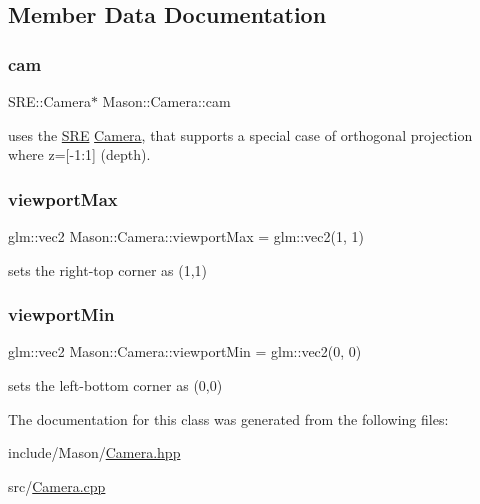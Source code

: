 \subsection{Member Data Documentation}
\hypertarget{class_mason_1_1_camera_a74f870fa866086c21f28f0a1f59254cc}{}\label{class_mason_1_1_camera_a74f870fa866086c21f28f0a1f59254cc} 
\subsubsection{\texorpdfstring{cam}{cam}}
{\footnotesize\ttfamily S\+R\+E\+::\+Camera$\ast$ Mason\+::\+Camera\+::cam\hspace{0.3cm}{\ttfamily [protected]}}



uses the \hyperlink{namespace_s_r_e}{S\+RE} \hyperlink{class_mason_1_1_camera}{Camera}, that supports a special case of orthogonal projection where z=\mbox{[}-\/1\+:1\mbox{]} (depth). 

\hypertarget{class_mason_1_1_camera_a8c7510e4c83e123aebbe7bb36da80de9}{}\label{class_mason_1_1_camera_a8c7510e4c83e123aebbe7bb36da80de9} 
\subsubsection{\texorpdfstring{viewport\+Max}{viewportMax}}
{\footnotesize\ttfamily glm\+::vec2 Mason\+::\+Camera\+::viewport\+Max = glm\+::vec2(1, 1)\hspace{0.3cm}{\ttfamily [protected]}}



sets the right-\/top corner as (1,1) 

\hypertarget{class_mason_1_1_camera_a87d7d4111e63ecb41bac7ea33ef270e1}{}\label{class_mason_1_1_camera_a87d7d4111e63ecb41bac7ea33ef270e1} 
\subsubsection{\texorpdfstring{viewport\+Min}{viewportMin}}
{\footnotesize\ttfamily glm\+::vec2 Mason\+::\+Camera\+::viewport\+Min = glm\+::vec2(0, 0)\hspace{0.3cm}{\ttfamily [protected]}}



sets the left-\/bottom corner as (0,0) 



The documentation for this class was generated from the following files\+:\begin{DoxyCompactItemize}
\item 
include/\+Mason/\hyperlink{_camera_8hpp}{Camera.\+hpp}\item 
src/\hyperlink{_camera_8cpp}{Camera.\+cpp}\end{DoxyCompactItemize}
